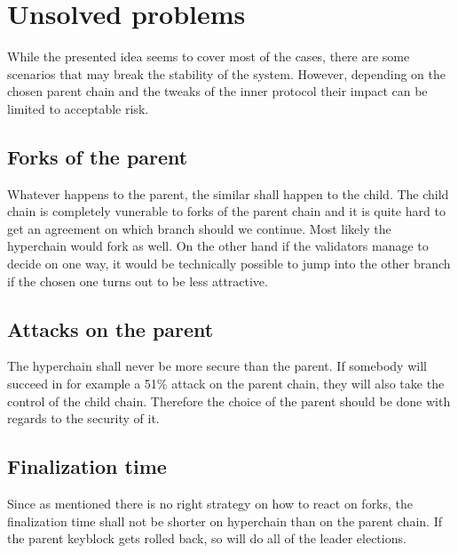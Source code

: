 \section{Unsolved problems}

While the presented idea seems to cover most of the cases, there are some
scenarios that may break the stability of the system. However, depending on the
chosen parent chain and the tweaks of the inner protocol their impact can be
limited to acceptable risk.

\subsection{Forks of the parent}
Whatever happens to the parent, the similar shall happen to the child. The child
chain is completely vunerable to forks of the parent chain and it is quite hard
to get an agreement on which branch should we continue. Most likely the
hyperchain would fork as well. On the other hand if the validators manage to
decide on one way, it would be technically possible to jump into the other
branch if the chosen one turns out to be less attractive.

\subsection{Attacks on the parent}

The hyperchain shall never be more secure than the parent. If somebody will
succeed in for example a 51\% attack on the parent chain, they will also take
the control of the child chain. Therefore the choice of the parent should be
done with regards to the security of it.

\subsection{Finalization time}

Since as mentioned there is no right strategy on how to react on forks, the
finalization time shall not be shorter on hyperchain than on the parent chain.
If the parent keyblock gets rolled back, so will do all of the leader elections.
